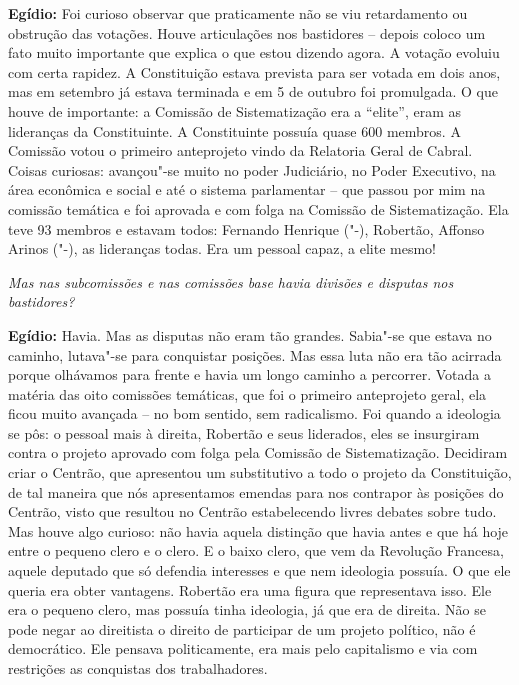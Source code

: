 \textbf{Egídio:} Foi curioso observar que praticamente não se viu
retardamento ou obstrução das votações. Houve articulações nos
bastidores -- depois coloco um fato muito importante que explica o que
estou dizendo agora. A votação evoluiu com certa rapidez. A Constituição
estava prevista para ser votada em dois anos, mas em setembro já estava
terminada e em 5 de outubro foi promulgada. O que houve de importante: a
Comissão de Sistematização era a ``elite'', eram as lideranças da
Constituinte. A Constituinte possuía quase 600 membros. A Comissão votou
o primeiro anteprojeto vindo da Relatoria Geral de Cabral. Coisas
curiosas: avançou"-se muito no poder Judiciário, no Poder Executivo, na
área econômica e social e até o sistema parlamentar -- que passou por
mim na comissão temática e foi aprovada e com folga na Comissão de
Sistematização. Ela teve 93 membros e estavam todos: Fernando Henrique
("-), Robertão, Affonso Arinos ("-), as lideranças todas. Era
um pessoal capaz, a elite mesmo!

\emph{Mas nas subcomissões e nas comissões base havia divisões e
disputas nos bastidores?}

\textbf{Egídio:} Havia. Mas as disputas não eram tão grandes. Sabia"-se
que estava no caminho, lutava"-se para conquistar posições. Mas essa luta
não era tão acirrada porque olhávamos para frente e havia um longo
caminho a percorrer. Votada a matéria das oito comissões temáticas, que
foi o primeiro anteprojeto geral, ela ficou muito avançada -- no bom
sentido, sem radicalismo. Foi quando a ideologia se pôs: o pessoal mais
à direita, Robertão e seus liderados, eles se insurgiram contra o
projeto aprovado com folga pela Comissão de Sistematização. Decidiram
criar o Centrão, que apresentou um substitutivo a todo o projeto da
Constituição, de tal maneira que nós apresentamos emendas para nos
contrapor às posições do Centrão, visto que resultou no Centrão
estabelecendo livres debates sobre tudo. Mas houve algo curioso: não
havia aquela distinção que havia antes e que há hoje entre o pequeno
clero e o clero. E o baixo clero, que vem da Revolução Francesa, aquele
deputado que só defendia interesses e que nem ideologia possuía. O que
ele queria era obter vantagens. Robertão era uma figura que representava
isso. Ele era o pequeno clero, mas possuía tinha ideologia, já que era
de direita. Não se pode negar ao direitista o direito de participar de
um projeto político, não é democrático. Ele pensava politicamente, era
mais pelo capitalismo e via com restrições as conquistas dos
trabalhadores.

